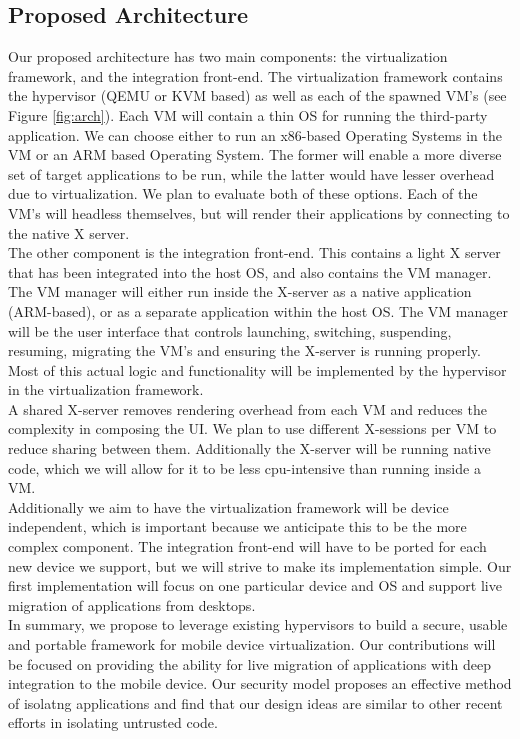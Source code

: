 \subsection{Proposed Architecture}
\label{sec:proposedarch}
Our proposed architecture has two main components: the virtualization framework, and the integration front-end.  The virtualization framework contains the hypervisor (QEMU or KVM based) as well as each of the spawned VM's (see Figure \ref{fig:arch}).  Each VM will contain a thin OS for running the third-party application.  We can choose either to run an x86-based Operating Systems in the VM or an ARM based Operating System. The former will enable a more diverse set of target applications to be run, while the latter would have lesser overhead due to virtualization. We plan to evaluate both of these options. Each of the VM's will headless themselves, but will render their applications by connecting to the native X server. \\

The other component is the integration front-end.  This contains a light X server that has been integrated into the host OS, and also contains the VM manager.  The VM manager will either run inside the X-server as a native application (ARM-based), or as a separate application within the host OS.  The VM manager will be the user interface that controls launching, switching, suspending, resuming, migrating the VM's and ensuring the X-server is running properly. Most of this actual logic and functionality will be implemented by the hypervisor in the virtualization framework.\\

A shared X-server removes rendering overhead from each VM and reduces the complexity in composing the UI. We plan to use different X-sessions per VM to reduce sharing between them. Additionally the X-server will be running native code, which we will allow for it to be less cpu-intensive than running inside a VM. \\

Additionally we aim to have the virtualization framework will be device independent, which is important because we anticipate this to be the more complex component.  The integration front-end will have to be ported for each new device we support, but we will strive to make its implementation simple. Our first implementation will focus on one particular device and OS and support live migration of applications from desktops. \\

In summary, we propose to leverage existing hypervisors to build a secure, usable and portable framework for mobile device virtualization. Our contributions will be focused on providing the ability for live migration of applications with deep integration to the mobile device. Our security model proposes an effective method of isolatng applications and find that our design ideas are similar to other recent efforts \cite{grier2008secure} in isolating untrusted code.
